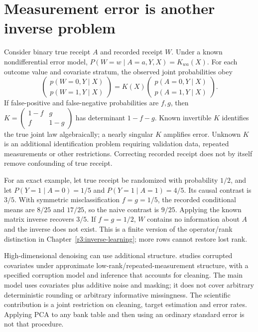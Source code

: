 \section{Measurement error is another inverse problem}
\label{r3:measurement}
Consider binary true receipt $A$ and recorded receipt $W$. Under a
known nondifferential error model,
$P(W=w\mid A=a,Y,X)=K_{wa}(X)$. For each outcome value and covariate
stratum, the observed joint probabilities obey
\begin{equation}
 \begin{pmatrix}p(W=0,Y\mid X)\\p(W=1,Y\mid X)\end{pmatrix}
 =K(X)\begin{pmatrix}p(A=0,Y\mid X)\\p(A=1,Y\mid X)\end{pmatrix}.
 \label{r3:misclassification}
\end{equation}
If false-positive and false-negative probabilities are $f,g$, then
$K=\left(\begin{smallmatrix}1-f&g\\ f&1-g\end{smallmatrix}\right)$
has determinant $1-f-g$. Known invertible $K$ identifies the true
joint law algebraically; a nearly singular $K$ amplifies error.
Unknown $K$ is an additional identification problem requiring validation
data, repeated measurements or other restrictions. Correcting recorded
receipt does not by itself remove confounding of true receipt.

For an exact example, let true receipt be randomized with probability
$1/2$, and let $P(Y=1\mid A=0)=1/5$ and
$P(Y=1\mid A=1)=4/5$. Its causal contrast is $3/5$.
With symmetric misclassification $f=g=1/5$, the recorded conditional
means are $8/25$ and $17/25$, so the naive contrast is $9/25$.
Applying the known matrix inverse recovers $3/5$. If $f=g=1/2$,
$W$ contains no information about $A$ and the inverse does not exist.
This is a finite version of the operator/rank distinction in
Chapter~\ref{r3:inverse-learning}; more rows cannot restore lost rank.

High-dimensional denoising can use additional structure.
\citet[Sections 3.2--3.3 and 4]{corrupt2022} studies corrupted covariates
under approximate low-rank/repeated-measurement structure, with a
specified corruption model and inference that accounts for cleaning.
The main model uses covariates plus additive noise and masking; it does
not cover arbitrary deterministic rounding or arbitrary informative
missingness. The scientific contribution is a joint restriction on
cleaning, target estimation and error rates. Applying PCA to any bank
table and then using an ordinary standard error is not that procedure.


